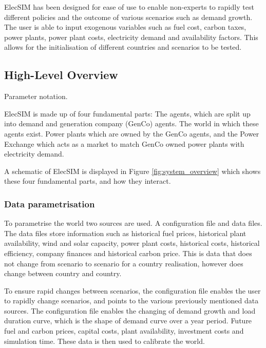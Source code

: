
ElecSIM has been designed for ease of use to enable non-experts to rapidly test different policies and the outcome of various scenarios such as demand growth. The user is able to input exogenous variables such as fuel cost, carbon taxes, power plants, power plant costs, electricity demand and availability factors. This allows for the initialisation of different countries and scenarios to be tested.


\subsection{High-Level Overview}

\begin{table}[h]
	\centering
	\caption{Parameter notation.}
\end{table}


ElecSIM is made up of four fundamental parts: The agents, which are split up into demand and generation company (GenCo) agents. The world in which these agents exist. Power plants which are owned by the GenCo agents, and the Power Exchange which acts as a market to match GenCo owned power plants with electricity demand.

A schematic of ElecSIM is displayed in Figure \ref{fig:system_overview} which shows these four fundamental parts, and how they interact.

\subsubsection{Data parametrisation} To parametrise the world two sources are used. A configuration file and data files. The data files store information such as historical fuel prices, historical plant availability, wind and solar capacity, power plant costs, historical costs, historical efficiency, company finances and historical carbon price. This is data that does not change from scenario to scenario for a country realisation, however does change between country and country.

To ensure rapid changes between scenarios, the configuration file enables the user to rapidly change scenarios, and points to the various previously mentioned data sources. The configuration file enables the changing of demand growth and load duration curve, which is the shape of demand curve over a year period. Future fuel and carbon prices, capital costs, plant availability, investment costs and simulation time. These data is then used to calibrate the world. 

